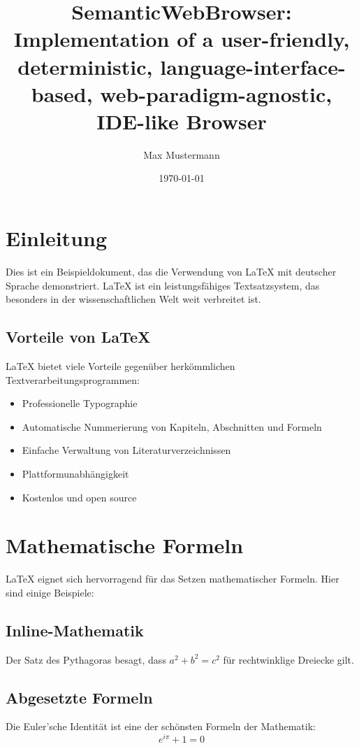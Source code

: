 \documentclass[12pt,a4paper]{article}
\title{SemanticWebBrowser: Implementation of a user-friendly, deterministic, language-interface-based, web-paradigm-agnostic, IDE-like Browser}
\author{Max Mustermann}
\date{\today}
\begin{document}
\maketitle

\tableofcontents
\newpage

\section{Einleitung}

Dies ist ein Beispieldokument, das die Verwendung von LaTeX mit deutscher Sprache demonstriert. LaTeX ist ein leistungsfähiges Textsatzsystem, das besonders in der wissenschaftlichen Welt weit verbreitet ist.

\subsection{Vorteile von LaTeX}

LaTeX bietet viele Vorteile gegenüber herkömmlichen Textverarbeitungsprogrammen:

\begin{itemize}
    \item Professionelle Typographie
    \item Automatische Nummerierung von Kapiteln, Abschnitten und Formeln
    \item Einfache Verwaltung von Literaturverzeichnissen
    \item Plattformunabhängigkeit
    \item Kostenlos und open source
\end{itemize}

\section{Mathematische Formeln}

LaTeX eignet sich hervorragend für das Setzen mathematischer Formeln. Hier sind einige Beispiele:

\subsection{Inline-Mathematik}
Der Satz des Pythagoras besagt, dass $a^2 + b^2 = c^2$ für rechtwinklige Dreiecke gilt.

\subsection{Abgesetzte Formeln}
Die Euler'sche Identität ist eine der schönsten Formeln der Mathematik:
\begin{equation}
    e^{i\pi} + 1 = 0
\end{equation}
\end{document}
